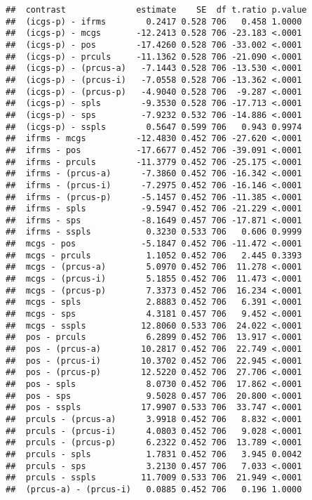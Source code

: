 \documentclass[
]{article}
\begin{document}
\begin{verbatim}
##  contrast              estimate    SE  df t.ratio p.value
##  (icgs-p) - ifrms        0.2417 0.528 706   0.458 1.0000 
##  (icgs-p) - mcgs       -12.2413 0.528 706 -23.183 <.0001 
##  (icgs-p) - pos        -17.4260 0.528 706 -33.002 <.0001 
##  (icgs-p) - prculs     -11.1362 0.528 706 -21.090 <.0001 
##  (icgs-p) - (prcus-a)   -7.1443 0.528 706 -13.530 <.0001 
##  (icgs-p) - (prcus-i)   -7.0558 0.528 706 -13.362 <.0001 
##  (icgs-p) - (prcus-p)   -4.9040 0.528 706  -9.287 <.0001 
##  (icgs-p) - spls        -9.3530 0.528 706 -17.713 <.0001 
##  (icgs-p) - sps         -7.9232 0.532 706 -14.886 <.0001 
##  (icgs-p) - sspls        0.5647 0.599 706   0.943 0.9974 
##  ifrms - mcgs          -12.4830 0.452 706 -27.620 <.0001 
##  ifrms - pos           -17.6677 0.452 706 -39.091 <.0001 
##  ifrms - prculs        -11.3779 0.452 706 -25.175 <.0001 
##  ifrms - (prcus-a)      -7.3860 0.452 706 -16.342 <.0001 
##  ifrms - (prcus-i)      -7.2975 0.452 706 -16.146 <.0001 
##  ifrms - (prcus-p)      -5.1457 0.452 706 -11.385 <.0001 
##  ifrms - spls           -9.5947 0.452 706 -21.229 <.0001 
##  ifrms - sps            -8.1649 0.457 706 -17.871 <.0001 
##  ifrms - sspls           0.3230 0.533 706   0.606 0.9999 
##  mcgs - pos             -5.1847 0.452 706 -11.472 <.0001 
##  mcgs - prculs           1.1052 0.452 706   2.445 0.3393 
##  mcgs - (prcus-a)        5.0970 0.452 706  11.278 <.0001 
##  mcgs - (prcus-i)        5.1855 0.452 706  11.473 <.0001 
##  mcgs - (prcus-p)        7.3373 0.452 706  16.234 <.0001 
##  mcgs - spls             2.8883 0.452 706   6.391 <.0001 
##  mcgs - sps              4.3181 0.457 706   9.452 <.0001 
##  mcgs - sspls           12.8060 0.533 706  24.022 <.0001 
##  pos - prculs            6.2899 0.452 706  13.917 <.0001 
##  pos - (prcus-a)        10.2817 0.452 706  22.749 <.0001 
##  pos - (prcus-i)        10.3702 0.452 706  22.945 <.0001 
##  pos - (prcus-p)        12.5220 0.452 706  27.706 <.0001 
##  pos - spls              8.0730 0.452 706  17.862 <.0001 
##  pos - sps               9.5028 0.457 706  20.800 <.0001 
##  pos - sspls            17.9907 0.533 706  33.747 <.0001 
##  prculs - (prcus-a)      3.9918 0.452 706   8.832 <.0001 
##  prculs - (prcus-i)      4.0803 0.452 706   9.028 <.0001 
##  prculs - (prcus-p)      6.2322 0.452 706  13.789 <.0001 
##  prculs - spls           1.7831 0.452 706   3.945 0.0042 
##  prculs - sps            3.2130 0.457 706   7.033 <.0001 
##  prculs - sspls         11.7009 0.533 706  21.949 <.0001 
##  (prcus-a) - (prcus-i)   0.0885 0.452 706   0.196 1.0000 

\end{verbatim}
\end{document}
